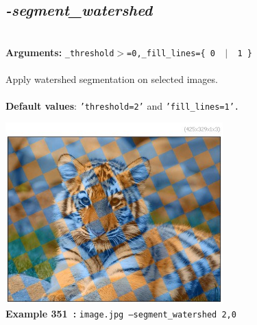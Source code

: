 \documentclass[a4paper,11pt,twoside]{book}
\begin{document}
\subsection{\emph{-segment\_watershed} }\vspace*{-0.5em}
~\\\textbf{Arguments: } 
{\small \texttt{\_threshold$>$=0,\_fill\_lines=\{ 0 ~$|$~ 1 \}}}\\~\\
Apply watershed segmentation on selected images.
~\\~\\\textbf{Default values}: {\small \texttt{'threshold=2'} and \texttt{'fill\_lines=1'.}}
\begin{center}\includegraphics[keepaspectratio=true,height=7cm,width=\textwidth]{img/gmic_def351.jpg}\\
{\footnotesize \textbf{Example 351~:} \texttt{image.jpg --segment\_watershed 2,0}}
\end{center}
\end{document}
